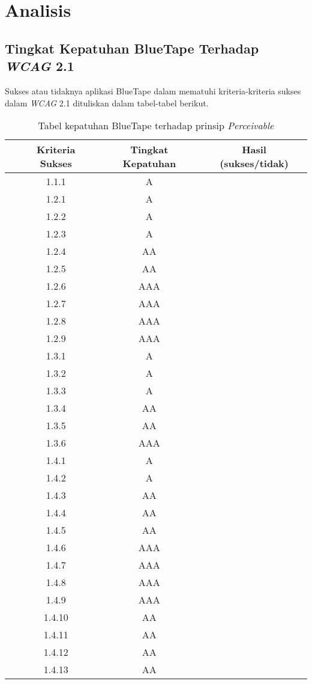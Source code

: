 \chapter{Analisis}
\label{chap:analisis}

\section{Tingkat Kepatuhan BlueTape Terhadap \textit{WCAG} 2.1}
Sukses atau tidaknya aplikasi BlueTape dalam mematuhi kriteria-kriteria sukses dalam \textit{WCAG} 2.1 dituliskan dalam tabel-tabel berikut.
\begin{table}[H]
    \centering 
    \caption{Tabel kepatuhan BlueTape terhadap prinsip \textit{Perceivable}}
    \label{tab:kepatuhan_bluetape_perceivable}
    \begin{tabular}{cccc}
        \toprule
        & Kriteria Sukses & Tingkat Kepatuhan & Hasil (sukses/tidak)\\

        \midrule
        & 1.1.1 & A & \\
        & 1.2.1 & A & \\
        & 1.2.2 & A & \\
        & 1.2.3 & A & \\
        & 1.2.4 & AA & \\
        & 1.2.5 & AA & \\
        & 1.2.6 & AAA & \\
        & 1.2.7 & AAA & \\
        & 1.2.8 & AAA & \\
        & 1.2.9 & AAA & \\
        & 1.3.1 & A & \\
        & 1.3.2 & A & \\
        & 1.3.3 & A & \\
        & 1.3.4 & AA & \\
        & 1.3.5 & AA & \\
        & 1.3.6 & AAA & \\
        & 1.4.1 & A & \\
        & 1.4.2 & A & \\
        & 1.4.3 & AA & \\
        & 1.4.4 & AA & \\
        & 1.4.5 & AA & \\
        & 1.4.6 & AAA & \\
        & 1.4.7 & AAA & \\
        & 1.4.8 & AAA & \\
        & 1.4.9 & AAA & \\
        & 1.4.10 & AA & \\
        & 1.4.11 & AA & \\
        & 1.4.12 & AA & \\
        & 1.4.13 & AA & \\
        
        \bottomrule

    \end{tabular}
\end{table}
